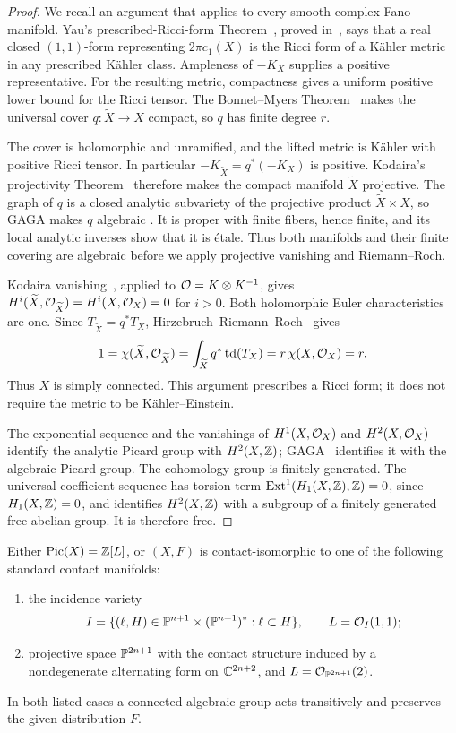 \begin{proof}
We recall an argument that applies to every smooth complex Fano
manifold. Yau's prescribed-Ricci-form Theorem~\cite[Theorem~1]{Yau1977},
proved in~\cite{Yau1978}, says that
a real closed $(1,1)$-form representing $2\pi c_1(X)$ is the Ricci form
of a K\"ahler metric in any prescribed K\"ahler class. Ampleness of
$-K_X$ supplies a positive representative. For the resulting metric,
compactness gives a uniform positive lower bound for the Ricci tensor.
The Bonnet--Myers Theorem~\cite{Myers1941} makes the universal cover
$q:\widetilde X\to X$ compact, so $q$ has finite degree $r$.

The cover is holomorphic and unramified, and the lifted metric
is K\"ahler with positive Ricci tensor. In particular
$-K_{\widetilde X}=q^*(-K_X)$ is positive. Kodaira's projectivity
Theorem~\cite[Section~3, p.~316]{Kodaira1954} therefore makes the
compact manifold $\widetilde X$ projective. The graph of $q$ is a
closed analytic subvariety of the projective product
$\widetilde X\times X$, so GAGA makes $q$ algebraic
\cite[Proposition~15]{Serre1956}. It is proper with finite fibers, hence finite,
and its local analytic inverses show that it is \'etale.
Thus both manifolds and their finite covering are algebraic before
we apply projective vanishing and Riemann--Roch.

Kodaira vanishing~\cite{Kodaira1953}, applied to $\mathcal O=K\otimes K^{-1}$, gives
$H^i(\widetilde X,\mathcal O_{\widetilde X})=H^i(X,\mathcal O_X)=0$ for $i>0$.
Both holomorphic Euler characteristics are one. Since
$T_{\widetilde X}=q^*T_X$, Hirzebruch--Riemann--Roch~\cite{Hirzebruch1954} gives
\[
1=\chi(\widetilde X,\mathcal O_{\widetilde X})
 =\int_{\widetilde X}q^*\operatorname{td}(T_X)
 =r\,\chi(X,\mathcal O_X)=r.
\]
Thus $X$ is simply connected. This argument prescribes a Ricci form;
it does not require the metric to be K\"ahler--Einstein.

The exponential sequence and the vanishings of $H^1(X,\mathcal O_X)$ and
$H^2(X,\mathcal O_X)$ identify the analytic Picard group with $H^2(X,\mathbb Z)$;
GAGA~\cite{Serre1956} identifies it with the algebraic Picard group. The cohomology
group is finitely generated. The universal coefficient sequence
has torsion term $\operatorname{Ext}^1(H_1(X,\mathbb Z),\mathbb Z)=0$, since
$H_1(X,\mathbb Z)=0$, and identifies $H^2(X,\mathbb Z)$ with a subgroup of a
finitely generated free abelian group. It is therefore free.
\end{proof}

\begin{proposition}\label{red:alternatives}
Either $\operatorname{Pic}(X)=\mathbb Z[L]$, or $(X,F)$ is contact-isomorphic
to one of the following standard contact manifolds:
\begin{enumerate}
\item the incidence variety
\[
I=\{(\ell,H)\in\mathbb P^{n+1}\times(\mathbb P^{n+1})^*: \ell\subset H\},
\qquad L=\mathcal O_I(1,1);
\]
\item projective space $\mathbb P^{2n+1}$ with the contact structure induced
by a nondegenerate alternating form on $\mathbb C^{2n+2}$, and
$L=\mathcal O_{\mathbb P^{2n+1}}(2)$.
\end{enumerate}
In both listed cases a connected algebraic group acts transitively
and preserves the given distribution $F$.
\end{proposition}

